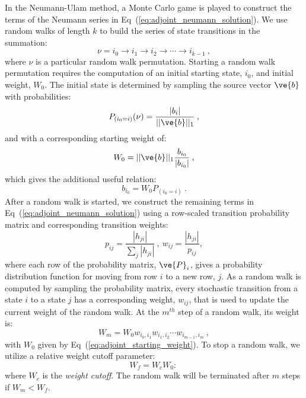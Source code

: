 \documentclass[preprint,11pt]{elsarticle}
\begin{document}
In the Neumann-Ulam method, a Monte Carlo game is played to construct the
terms of the Neumann series in Eq~(\ref{eq:adjoint_neumann_solution}). We use
random walks of length $k$ to build the series of state transitions in the
summation:
\begin{equation}
  \nu = i_0 \rightarrow i_1 \rightarrow i_2 \rightarrow \cdots \rightarrow
  i_{k-1}\:,
  \label{eq:permutation}
\end{equation}
where $\nu$ is a particular random walk permutation. Starting a random walk
permutation requires the computation of an initial starting state, $i_0$, and
initial weight, $W_0$. The initial state is determined by sampling the source
vector $\ve{b}$ with probabilities:
\begin{equation}
  P_{(i_0=i)}(\nu) = \frac{|b_i|}{||\ve{b}||_1}\:,
  \label{eq:adjoint_source_probability}
\end{equation}
and with a corresponding starting weight of:
\begin{equation}
  W_0 = ||\ve{b}||_1 \frac{b_{i_0}}{|b_{i_0}|}\:,
  \label{eq:adjoint_starting_weight}
\end{equation}
which gives the additional useful relation:
\begin{equation}
  b_{i_0} = W_0 P_{(i_0=i)}\:.
  \label{eq:adjoint_source_definition}
\end{equation}
After a random walk is started, we construct the remaining terms in
Eq~(\ref{eq:adjoint_neumann_solution}) using a row-scaled transition probability
matrix and corresponding transition weights:
\begin{equation}
  p_{ij} = \frac{|h_{ji}|}{\sum_j |h_{ji}|}\:,\ w_{ij} =
  \frac{|h_{ji}|}{p_{ij}},
  \label{eq:adjoint_probability}
\end{equation}
where each row of the probability matrix, $\ve{P}_i$, gives a probability
distribution function for moving from row $i$ to a new row, $j$. As a random
walk is computed by sampling the probability matrix, every stochastic
transition from a state $i$ to a state $j$ has a corresponding weight,
$w_{ij}$, that is used to update the current weight of the random walk. At the
$m^{th}$ step of a random walk, its weight is:
\begin{equation}
  W_{m} = W_0 w_{i_0,i_1} w_{i_1,i_2} \cdots w_{i_{m-1},i_m}\:,
  \label{eq:direct_permutation_weight}
\end{equation}
with $W_0$ given by Eq~(\ref{eq:adjoint_starting_weight}). To stop a random
walk, we utilize a relative weight cutoff parameter:
\begin{equation}
  W_f = W_c W_0:\,
  \label{eq:relative_weight_cutoff}
\end{equation}
where $W_c$ is the \textit{weight cutoff}. The random walk will be terminated
after $m$ steps if $W_m < W_f$.
\end{document}
